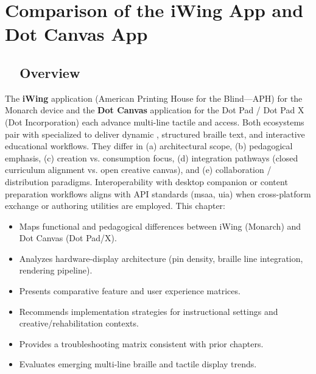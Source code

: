 \chapter{Comparison of the iWing App and Dot Canvas App}
\label{chap:iwIng-vs-dotcanvas}

\section{~~Overview}
\label{sec:sr29-overview}
The \textbf{iWing} application (American Printing House for the Blind—APH) for the Monarch  device and the \textbf{Dot Canvas} application for the Dot Pad / Dot Pad X (Dot Incorporation) each advance multi-line tactile and  access. Both ecosystems pair  with specialized  to deliver dynamic , structured braille text, and interactive educational workflows. They differ in (a) architectural scope, (b) pedagogical emphasis, (c) creation vs. consumption focus, (d) integration pathways (closed curriculum alignment vs. open creative canvas), and (e) collaboration / distribution paradigms. Interoperability with desktop companion or content preparation workflows aligns with  API standards (\gls{msaa}, \gls{uia}) when cross-platform exchange or authoring utilities are employed. This chapter:
\begin{itemize}
	\item Maps functional and pedagogical differences between iWing (Monarch) and Dot Canvas (Dot Pad/X).
	\item Analyzes hardware-display architecture (pin density, braille line integration, rendering pipeline).
	\item Presents comparative feature and user experience matrices.
	\item Recommends implementation strategies for instructional settings and creative/rehabilitation contexts.
	\item Provides a troubleshooting matrix consistent with prior chapters.
	\item Evaluates emerging multi-line braille and tactile display trends.
\end{itemize}

